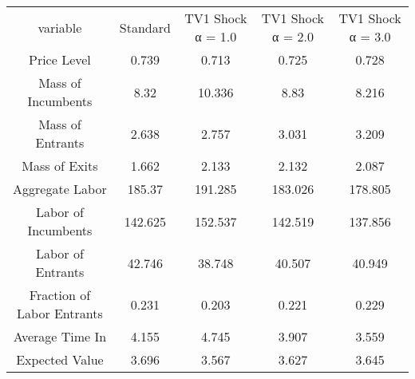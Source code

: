 \begin{tabular}{ccccc}
variable & Standard & TV1 Shock α = 1.0 & TV1 Shock α = 2.0 & TV1 Shock α = 3.0\\
Price Level & 0.739 & 0.713 & 0.725 & 0.728\\
Mass of Incumbents & 8.32 & 10.336 & 8.83 & 8.216\\
Mass of Entrants & 2.638 & 2.757 & 3.031 & 3.209\\
Mass of Exits & 1.662 & 2.133 & 2.132 & 2.087\\
Aggregate Labor & 185.37 & 191.285 & 183.026 & 178.805\\
Labor of Incumbents & 142.625 & 152.537 & 142.519 & 137.856\\
Labor of Entrants & 42.746 & 38.748 & 40.507 & 40.949\\
Fraction of Labor Entrants & 0.231 & 0.203 & 0.221 & 0.229\\
Average Time In & 4.155 & 4.745 & 3.907 & 3.559\\
Expected Value & 3.696 & 3.567 & 3.627 & 3.645\\
\end{tabular}
